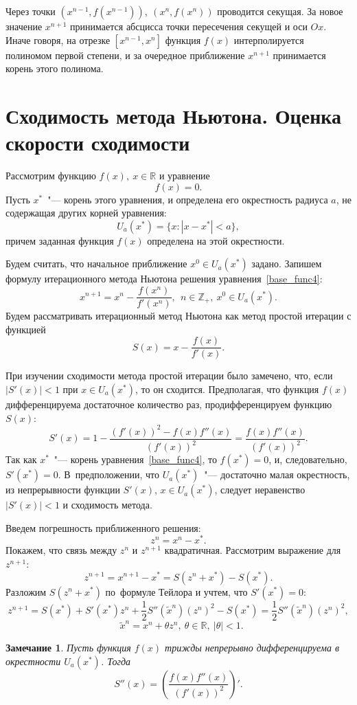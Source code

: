 \documentclass[11pt,a4paper,twoside]{report}
\numberwithin{equation}{section}
\theoremstyle{definition}
\theoremstyle{plain}
\newtheorem*{note*}{Замечание}
\begin{document}
Через точки $(x^{n-1}, f(x^{n-1})), ~(x^n, f(x^n))$ проводится секущая.
За новое значение $x^{n+1}$ принимается абсцисса точки пересечения секущей
и оси $Ox$. Иначе говоря, на отрезке $[x^{n-1}, x^n]$ функция $f(x)$ интерполируется
полиномом первой степени, и за очередное приближение $x^{n+1}$ принимается
корень этого полинома.
%
\section{Сходимость метода Ньютона. Оценка скорости сходимости}
%
Рассмотрим функцию $f(x), ~x\in \mathbb{R}$ и уравнение
%
\begin{equation}
%
    \label{base_func4}
    f(x)=0.
%
\end{equation}
%
Пусть $x^*$~"--- корень этого уравнения, и определена его
окрестность радиуса $a$, не содержащая других корней уравнения:
%
$$
    U_a(x^*)=\{x:|x-x^*| < a\},
$$
%
причем заданная функция $f(x)$ определена на этой окрестности.

Будем считать, что начальное приближение $x^0 \in U_a(x^*)$ задано.
Запишем формулу итерационного метода Ньютона решения уравнения~\eqref{base_func4}:
%
$$
    x^{n + 1} = x^n - \frac{f(x^n)}{f'(x^n)}, ~~n\in\mathbb{Z_+}, ~x^0 \in U_a(x^*).
$$
%
Будем рассматривать итерационный метод Ньютона как метод простой итерации
с функцией
%
$$
    S(x) = x - \frac{f(x)}{f'(x)}.
$$
%

При изучении сходимости метода простой итерации было замечено, что,
если $|S'(x)| < 1$ при $x \in U_a(x^*)$, то он сходится.
Предполагая, что функция $f(x)$ дифференцируема достаточное количество раз,
продифференцируем функцию $S(x)$:
%
$$
    S'(x) = 1 - \frac{(f'(x))^2 - f(x)f''(x)}{(f'(x))^2} =
    \frac{f(x)f''(x)}{(f'(x))^2}.
$$
%
Так как $x^*$~"--- корень уравнения~\eqref{base_func4}, то $f(x^*)=0$, и,
следовательно, $S'(x^*)=0$. В~предположении, что $U_a(x^*)$~"--- достаточно
малая окрестность, из непрерывности функции $S'(x)$,
$x \in U_a(x^*)$, следует неравенство $\left|S'(x)\right| < 1$ и сходимость метода.

Введем погрешность приближенного решения:
$$
    z^n = x^n - x^*.
$$
Покажем, что связь между $z^n$ и $z^{n+1}$ квадратичная.
Рассмотрим выражение для $z^{n+1}$:
%
\begin{equation}
%
    \label{headache}
    z^{n + 1} = x^{n + 1} - x^* = S(z^n + x^*) - S(x^*).
%
\end{equation}
%
Разложим $S(z^n + x^*)$ по~формуле Тейлора и учтем, что $S'(x^*)=0$:
%
\begin{equation}
%
    \label{terrible_headache}
    z^{n + 1} = S(x^*) + S'(x^*)z^n +
    \frac{1}{2}S''(\tilde{x}^n)\left(z^n\right)^2 - S(x^*) =
    \frac{1}{2}S''(\tilde{x}^n)(z^n)^2,
%
\end{equation}
%
%
$$
    ~~~\tilde{x}^n=x^n+\theta z^n, ~\theta\in\mathbb{R}, ~|\theta|<1.
$$
%
%
\begin{note*}
%
    Пусть функция $f(x)$ трижды непрерывно дифференцируема в окрестности
    $U_a(x^*)$. Тогда
    $$
        S''(x) = \left(\frac{f(x)f''(x)}{(f'(x))^2}\right)'.
    $$
%
\end{note*}
%
\end{document}
